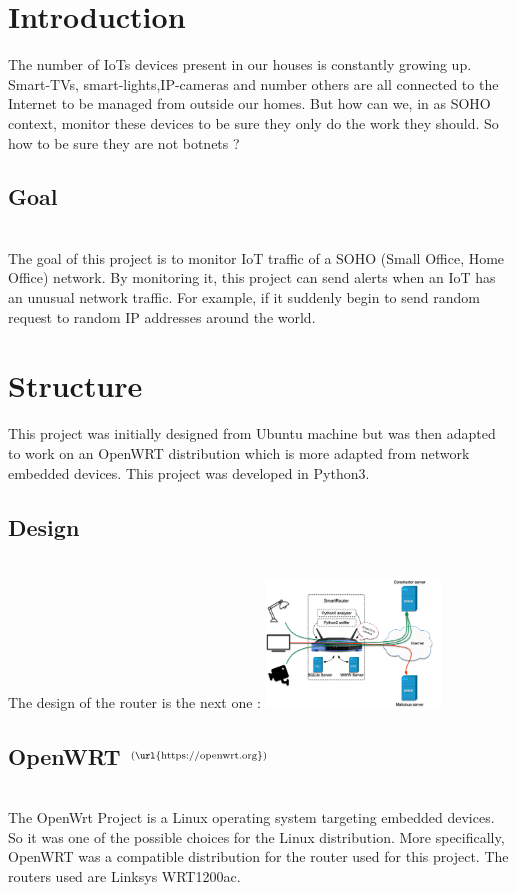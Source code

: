 \begin{frame}{}
\begin{multicols}{3}



\section{Introduction}
The number of IoTs devices present in our houses is constantly growing up. Smart-TVs, smart-lights,IP-cameras and number others are all connected to the Internet to be managed from outside our homes. But how can we, in as SOHO context, monitor these devices to be sure they only do the work they should. So how to be sure they are not botnets ? 

\subsection{Goal}\\
The goal of this project is to monitor IoT traffic of a SOHO (Small Office, Home Office) network. By monitoring it, this project can send alerts when an IoT has an unusual network traffic. For example, if it suddenly begin to send random request to random IP addresses around the world.


\section{Structure}
This project was initially designed from Ubuntu machine but was then adapted to work on an OpenWRT distribution which is more adapted from network embedded devices. This project was developed in Python3.

\subsection{Design}\\ 
The design of the router is the next one : 
\includegraphics[width=0.35\textwidth]{Pictures/design.png}


\subsection{OpenWRT $^{(\text{\url{https://openwrt.org}})}$}\\
The OpenWrt Project is a Linux operating system targeting embedded devices. So it was one of the possible choices for the Linux distribution. More specifically, OpenWRT was a compatible distribution for the router used for this project. The routers used are Linksys WRT1200ac.


\end{multicols}
\end{frame}
